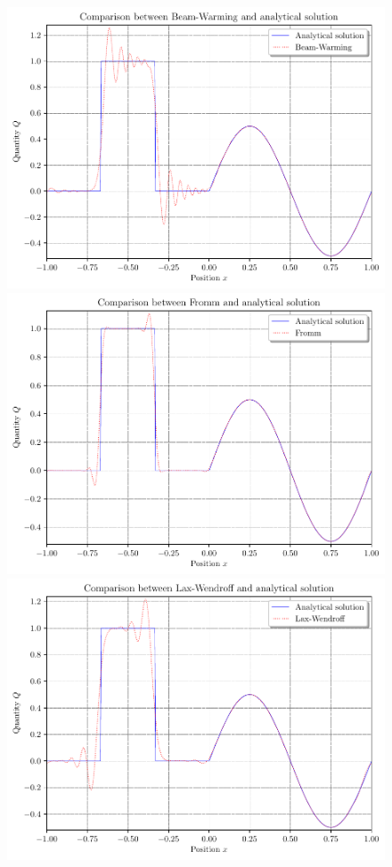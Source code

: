 \begin{figure}[ht!]
	\centering
	\includegraphics[width=.28\paperwidth]{graphics/Beam-Warming}
	\includegraphics[width=.28\paperwidth]{graphics/Fromm}
	\includegraphics[width=.28\paperwidth]{graphics/Lax-Wendroff}

\end{figure}
